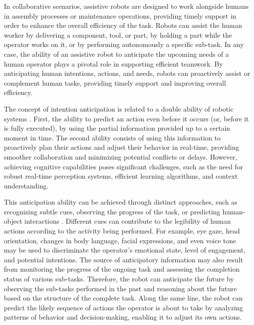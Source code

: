 In collaborative scenarios, assistive robots are designed to work alongside humans in assembly processes or maintenance operations, providing timely support in order to enhance the overall efficiency of the task. Robots can assist the human worker by delivering a component, tool, or part, by holding a part while the operator works on it, or by performing autonomously a specific sub-task. In any case, the ability of an assistive robot to anticipate the upcoming needs of a human operator plays a pivotal role in supporting efficient teamwork. By anticipating human intentions, actions, and needs, robots can proactively assist or complement human tasks, providing timely support and improving overall efficiency. 

The concept of intention anticipation is related to a double ability of robotic systems \cite{Hoffman2007,Williams2009,Huang2016,Duarte2018}. First, the ability to predict an action even before it occurs (or, before it is fully executed), by using the partial information provided up to a certain moment in time. The second ability consists of using this information to proactively plan their actions and adjust their behavior in real-time, providing smoother collaboration and minimizing potential conflicts or delays. However, achieving cognitive capabilities poses significant challenges, such as the need for robust real-time perception systems, efficient learning algorithms, and context understanding.

This anticipation ability can be achieved through distinct approaches, such as recognizing subtle cues, observing the progress of the task, or predicting human-object interactions \cite{Williams2009,Huang2015,Gorur2018,Gkioxari2018}. Different cues can contribute to the legibility of human actions according to the activity being performed. For example, eye gaze, head orientation, changes in body language, facial expressions, and even voice tone may be used to discriminate the operator's emotional state, level of engagement, and potential intentions. The source of anticipatory information may also result from monitoring the progress of the ongoing task and assessing the completion status of various sub-tasks. Therefore, the robot can anticipate the future by observing the sub-tasks performed in the past and reasoning about the future based on the structure of the complete task. Along the same line, the robot can predict the likely sequence of actions the operator is about to take by analyzing patterns of behavior and decision-making, enabling it to adjust its own actions.

